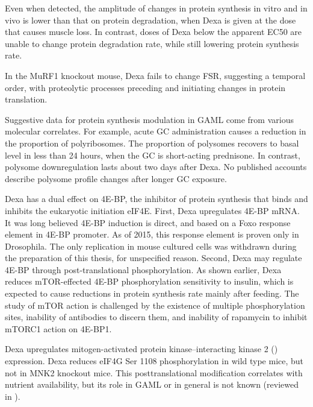 \documentclass[12pt,english]{report}\usepackage[]{graphicx}\usepackage[]{color}
\begin{document}
Even when detected, the amplitude of changes in protein synthesis
in vitro\citep{aversa2012beta-hydroxy-beta-methylbutyrate,desler1996effects,jones2005vitro}
and in vivo\citep{dardevet1998glucocorticoid} is lower than that
on protein degradation, when Dexa is given at the dose that causes
muscle loss. In contrast, doses of Dexa below the apparent EC50 are
unable to change protein degradation rate, while  still lowering protein
synthesis rate\citep{tomas1992insulin-like}.

In the MuRF1 knockout mouse, Dexa fails to change FSR\citep{baehr2011muscle},
suggesting a temporal order, with proteolytic processes preceding
and initiating changes in protein translation.

Suggestive data for protein synthesis modulation in GAML come from
various molecular correlates. For example, acute GC administration
causes a reduction in the proportion of polyribosomes\citep{young1968sedimentation}.
The proportion of polysomes recovers to basal level in less than 24
hours, when the GC is short-acting prednisone\citep{bullock1972relative}.
In contrast, polysome downregulation lasts about two days after Dexa.
No published accounts describe polysome profile changes after longer
GC exposure.

Dexa has a dual effect on 4E-BP, the inhibitor of protein synthesis
that binds and inhibits the eukaryotic initiation eIF4E. First, Dexa
upregulates 4E-BP mRNA\citep{wu2010redd1}. It was long believed 4E-BP
induction is direct, and based on a Foxo response element in 4E-BP
promoter\citep{bai2013activin}. As of 2015, this response element
is proven only in Drosophila. The only replication in mouse cultured
cells was withdrawn during the preparation of this thesis, for unspecified
reason. Second, Dexa may regulate 4E-BP through post-translational
phosphorylation. As shown earlier, Dexa reduces mTOR-effected 4E-BP
phosphorylation sensitivity to insulin, which is expected to cause
reductions in protein synthesis rate mainly after feeding. The study
of mTOR action is challenged by the existence of multiple phosphorylation
sites, inability of antibodies to discern them, and inability of rapamycin
to inhibit mTORC1 action on 4E-BP1\citep{livingstone2012rapamycin-insensitive}.

Dexa upregulates mitogen-activated protein kinase–interacting kinase
2 ()
expression\citep{hu2012mnk2}. Dexa reduces eIF4G Ser 1108 phosphorylation
in wild type mice, but not in MNK2 knockout mice. This posttranslational
modification correlates with nutrient availability, but its role in
GAML or in general is not known (reviewed in \citep{vary2007nutrient}).
\end{document}
